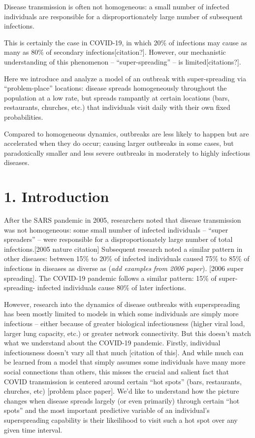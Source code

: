 Disease transmission is often not homogeneous: a small number of
infected individuals are responsible for a disproportionately large
number of subsequent infections.

This is certainly the case in COVID-19, in which 20\% of infections may
cause as many as 80\% of secondary infections{[}citation?{]}. However,
our mechanistic understanding of this phenomenon -- ``super-spreading''
-- is limited{[}citations?{]}.

Here we introduce and analyze a model of an outbreak with
super-spreading via ``problem-place'' locations: disease spreads
homogeneously throughout the population at a low rate, but spreads
rampantly at certain locations (bars, restaurants, churches, etc.) that
individuals visit daily with their own fixed probabilities.

Compared to homogeneous dynamics, outbreaks are less likely to happen
but are accelerated when they do occur; causing larger outbreaks in some
cases, but paradoxically smaller and less severe outbreaks in moderately
to highly infectious diseases.

\section{1. Introduction}\label{introduction}

After the SARS pandemic in 2005, researchers noted that disease
transmission was not homogeneous: some small number of infected
individuals -- ``super spreaders'' -- were responsible for a
disproportionately large number of total infections.{[}2005 nature
citation{]} Subsequent research noted a similar pattern in other
diseases: between 15\% to 20\% of infected individuals caused 75\% to
85\% of infections in diseases as diverse as (\emph{add examples from
2006 paper}). {[}2006 super spreading{]}. The COVID-19 pandemic follows
a similar pattern: 15\% of super-spreading- infected individuals cause
80\% of later infections.

However, research into the dynamics of disease outbreaks with
superspreading has been mostly limited to models in which some
individuals are simply more infectious -- either because of greater
biological infectiousness (higher viral load, larger lung capacity,
etc.) or greater network connectivity. But this doesn't match what we
understand about the COVID-19 pandemic. Firstly, individual
infectiousness doesn't vary all that much {[}citation of this{]}. And
while much can be learned from a model that simply assumes some
individuals have many more social connections than others, this misses
the crucial and salient fact that COVID transmission is centered around
certain ``hot spots'' (bars, restaurants, churches, etc) {[}problem
place paper{]}. We'd like to understand how the picture changes when
disease spreads largely (or even primarily) through certain ``hot
spots'' and the most important predictive variable of an individual's
superspreading capability is their likeilihood to visit such a hot spot
over any given time interval.

